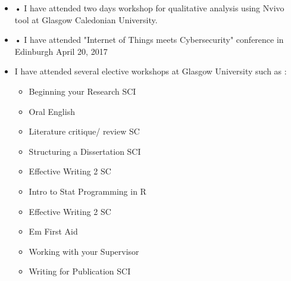 \begin{itemize}
	\item •	I have attended two days workshop for qualitative analysis using Nvivo tool at Glasgow Caledonian University.
	\item •	I have attended "Internet of Things meets Cybersecurity" conference in Edinburgh April 20, 2017
	\item I have attended several elective workshops at Glasgow University such as : \begin{itemize} 
		\item Beginning your Research SCI
		\item Oral English 
		\item Literature critique/ review SC
		\item Structuring a Dissertation SCI
		\item Effective Writing 2 SC
		\item Intro to Stat Programming in R
		\item Effective Writing 2 SC
		\item Em First Aid
		\item Working with your Supervisor
		\item Writing for Publication SCI
                \end{itemize}
\end{itemize}

